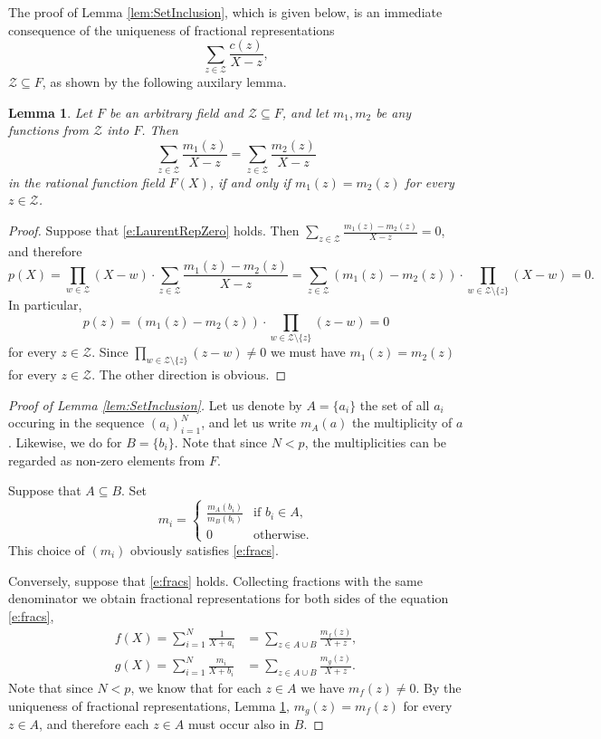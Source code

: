 \documentclass[11pt]{article}
\newtheorem{lem}[]{Lemma}
\theoremstyle{definition}
\theoremstyle{remark}
\begin{document}
The proof of Lemma \ref{lem:SetInclusion}, which is given below, is an immediate consequence of the uniqueness of fractional representations
\[
\sum_{z \in \mathcal Z} \frac{c(z)}{X - z},
\]
$\mathcal Z\subseteq F$, as shown by the following auxilary lemma.
\begin{lem}
\label{lem:UniqueFractionalRep}
Let $F$ be an arbitrary field and $\mathcal Z\subseteq F$, and let $m_1, m_2$ be any functions from $\mathcal Z$ into $F$.
Then
\begin{equation}
\label{e:LaurentRepZero}
\sum_{z\in\mathcal Z} \frac{m_1(z)}{X - z} = \sum_{z\in\mathcal Z} \frac{m_2(z)}{X - z}
\end{equation}
in the rational function field $F(X)$, if and only if $m_1(z)=m_2(z)$ for every $z\in \mathcal Z$.
\end{lem}
\begin{proof}
Suppose that \eqref{e:LaurentRepZero} holds.  
Then $\sum_{z\in\mathcal Z} \frac{m_1(z)-m_2(z)}{X - z} = 0$, and therefore
\[
p(X) = \prod_{w\in\mathcal Z} (X - w)\cdot\sum_{z\in\mathcal Z} \frac{m_1(z)-m_2(z)}{X - z} = \sum_{z\in\mathcal Z} (m_1(z)-m_2(z))\cdot \prod_{w\in\mathcal Z\setminus\{z\}} (X - w) = 0.
\]
In particular,
\[
p(z) = (m_1(z) - m_2(z)) \cdot  \prod_{w\in\mathcal Z\setminus\{z\}} (z - w)= 0
\]
for every $z\in\mathcal Z$.
Since   $\prod_{w\in\mathcal Z\setminus\{z\}} (z - w) \neq 0$ we must have $m_1(z)  = m_2(z)$ for every $z\in\mathcal Z$. 
The other direction is obvious.
\end{proof}


\begin{proof}[Proof of Lemma \ref{lem:SetInclusion}]
Let us denote by $A=\{a_i\}$ the set of all $a_i$ occuring in the sequence $(a_i)_{i=1}^N$, and let us write 
$m_A(a)$ the multiplicity of $a$.
Likewise, we do for $B=\{b_i\}$.
Note that since $N < p$, the multiplicities can be regarded as non-zero elements from $F$.

Suppose that $A\subseteq B$. 
Set 
\[
m_i = 
\begin{cases}
\frac{m_A(b_i)}{m_B(b_i)} & \text{if }b_i\in A,
\\
0 &\text{otherwise}.
\end{cases}
\]
This choice of $(m_i)$ obviously satisfies \eqref{e:fracs}.

Conversely, suppose that \eqref{e:fracs} holds.
Collecting fractions with the same denominator we obtain fractional representations for both sides of the equation \eqref{e:fracs},  
\begin{align*}
f(X) = \sum_{i=1}^N \frac{1}{X + a_i} &= \sum_{z\in A\cup B} \frac{m_f(z)}{X + z},
\\
g(X) = \sum_{i=1}^N \frac{m_i}{X + b_i} & = \sum_{z\in A\cup B} \frac{m_g(z)}{X + z}.
\end{align*}
Note that since $N < p$, we know that for each $z\in A$ we have $m_f(z)\neq 0$. 
By the uniqueness of fractional representations,  Lemma \ref{lem:UniqueFractionalRep}, $m_g(z) = m_f(z)$ for every $z\in A$, and therefore each $z\in A$ must occur also in $B$. 
\end{proof}
\end{document}
